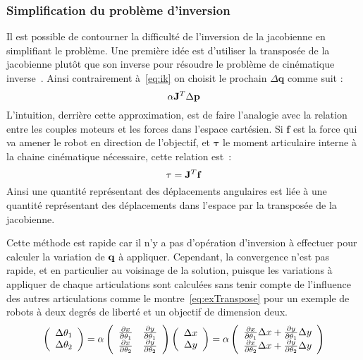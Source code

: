 \subsubsection{Simplification du problème d'inversion}
Il est possible de contourner la difficulté de l'inversion de la jacobienne en simplifiant
le problème.
Une première idée est d'utiliser la transposée de la jacobienne plutôt 
que son inverse pour résoudre le problème de cinématique inverse~\cite{wolovich84}.
Ainsi contrairement à~\eqref{eq:ik} on choisit le prochain $\Delta \mathbf{q}$ comme suit :
\begin{equation}\label{IK:Tr:Geq1}
  \alpha \mbf{J}^{T} \Delta \mathbf{p}
\end{equation}
L'intuition, derrière cette approximation, est de faire l'analogie avec
la relation entre les couples moteurs et les forces dans l'espace cartésien.
Si $\mathbf{f}$ est la force qui
va amener le robot en direction de l'objectif, et $\boldsymbol\tau$ le moment articulaire interne
à la chaine cinématique nécessaire, cette relation est~:
\begin{equation*}
  {\mathbf{\tau}} = {\mathbf{J}}^T {\mathbf{f}}
\end{equation*}
Ainsi une quantité représentant des déplacements angulaires est liée à une quantité représentant des 
déplacements dans l'espace par la transposée de la jacobienne.

Cette méthode est rapide car il n'y a pas d'opération d'inversion
à effectuer pour calculer la variation de ${\mathbf{q}}$ à appliquer.
Cependant, la convergence n'est pas rapide, et en particulier
au voisinage de la solution, puisque 
les variations à appliquer de chaque articulations sont calculées sans tenir compte de l'influence
des autres articulations comme le montre~\eqref{eq:exTranspose} pour un exemple de robots
à deux degrés de liberté et un objectif de dimension deux.
\begin{equation}
  \left(
  \begin{array}{c}
    \Delta \theta_1\\
    \Delta \theta_2
  \end{array}
  \right)
  = \alpha \left( 
  \begin{array}{cc}
    \dpartial{x}{\theta_1} & \dpartial{y}{\theta_1}\\
    \dpartial{x}{\theta_2} & \dpartial{y}{\theta_2}
  \end{array}
  \right)
  \left(
  \begin{array}{c}
    \Delta x\\
    \Delta y
  \end{array}
  \right)
  = \alpha \left( 
  \begin{array}{c}
    \dpartial{x}{\theta_1} \Delta x + \dpartial{y}{\theta_1} \Delta y\\
    \dpartial{x}{\theta_2} \Delta x + \dpartial{y}{\theta_2} \Delta y
  \end{array}
  \right)
  \label{eq:exTranspose}
\end{equation}

